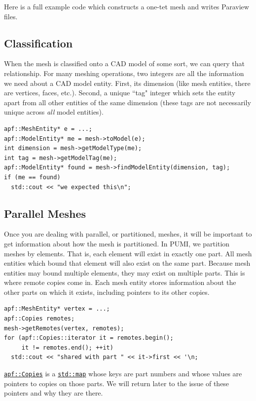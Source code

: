 \documentclass{article}
\begin{document}
Here is a full example code which constructs a one-tet
mesh and writes Paraview files.



\subsection{Classification}

When the mesh is classified onto a CAD model of some sort, we
can query that relationship.
For many meshing operations, two integers are all the information
we need about a CAD model entity.
First, its dimension (like mesh entities, there are vertices, faces, etc.).
Second, a unique ``tag" integer which sets the entity apart from
all other entities of the same dimension (these tags are not necessarily
unique across \emph{all} model entities).

\begin{lstlisting}
apf::MeshEntity* e = ...;
apf::ModelEntity* me = mesh->toModel(e);
int dimension = mesh->getModelType(me);
int tag = mesh->getModelTag(me);
apf::ModelEntity* found = mesh->findModelEntity(dimension, tag);
if (me == found)
  std::cout << "we expected this\n";
\end{lstlisting}

\subsection{Parallel Meshes}

Once you are dealing with parallel, or partitioned, meshes,
it will be important to get information about how the
mesh is partitioned.
In PUMI, we partition meshes by elements.
That is, each element will exist in exactly one part.
All mesh entities which bound that element will also exist on
the same part.
Because mesh entities may bound multiple elements, they may
exist on multiple parts.
This is where remote copies come in.
Each mesh entity stores information about the other parts
on which it exists, including pointers to its other copies.

\begin{lstlisting}
apf::MeshEntity* vertex = ...;
apf::Copies remotes;
mesh->getRemotes(vertex, remotes);
for (apf::Copies::iterator it = remotes.begin();
     it != remotes.end(); ++it)
  std::cout << "shared with part " << it->first << '\n;
\end{lstlisting}

\href{http://scorec.rpi.edu/~dibanez/core/namespaceapf.html#a4fdcb1e40963596d8345f0328e7d65b1}{\texttt{apf::Copies}}
is a
\href{http://www.cplusplus.com/reference/map/map/}{\texttt{std::map}}
whose keys are part numbers and whose
values are pointers to copies on those parts.
We will return later to the issue of these pointers and
why they are there.
\end{document}
